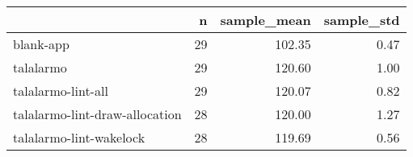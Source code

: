 \begin{tabular}{lrrr}
\toprule
{} &   n &  sample\_mean &  sample\_std \\
\midrule
blank-app                      &  29 &       102.35 &        0.47 \\
talalarmo                      &  29 &       120.60 &        1.00 \\
talalarmo-lint-all             &  29 &       120.07 &        0.82 \\
talalarmo-lint-draw-allocation &  28 &       120.00 &        1.27 \\
talalarmo-lint-wakelock        &  28 &       119.69 &        0.56 \\
\bottomrule
\end{tabular}
